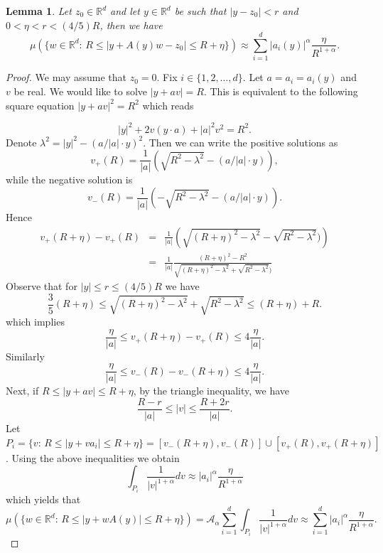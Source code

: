 \documentclass[a4paper,12pt,reqno]{amsart}
\newtheorem{lemma}[theorem]{Lemma}
\theoremstyle{definition}
\theoremstyle{remark}
\newcommand{\Aa}{\mathcal{A}_{\alpha}}
\newcommand{\R}{\mathds{R}}
\newcommand{\Rd}{\mathds{R}^d}
\begin{document}
\begin{lemma}\label{large} Let $z_0\in \Rd$ and let $y\in \Rd$ be such that $|y-z_0|< r$ and $0<\eta<r<(4/5)R$, then
we have $$\mu(\{w \in \R^d: \,  R\le|y + A(y) w- z_0|\le R+\eta\})\approx \sum_{i=1}^d|a_i(y)|^\alpha   \frac \eta{R^{1+\alpha}}.$$ 
\end{lemma}
\begin{proof} We may assume that $z_0=0$. Fix $i\in \{1,2,\dots,d\}$. Let  $ a= a_i= a_i(y)$ and $v$ be real.
We would like to solve $|y+av|=R$.  This is equivalent to the following square equation  $|y+av|^2=R^2$ which reads

$$|y|^2+2v(y\cdot a)+|a|^2v^2=R^2.$$
Denote $\lambda^2 = |y|^2- (a/|a|\cdot y)^2$.
Then we can write the positive solutions as  
\begin{equation}
\label{vplus}
v_{+}(R)=\frac1{|a|}\left( \sqrt {R^2-\lambda^2 }- (a/|a|\cdot y)\right),
\end{equation}
while the negative solution is
\begin{equation}
\label{vminus}
v_{-}(R)=\frac1{|a|}\left( -\sqrt {R^2-\lambda^2 }- (a/|a|\cdot y)\right).
\end{equation}
Hence
\begin{eqnarray*}v_{+}(R+\eta)-v_{+}(R)&=&\frac1{|a|}\left(\sqrt {(R+\eta)^2-\lambda^2 }- \sqrt {R^2-\lambda^2 })\right)\\
&=&\frac1{|a|}\frac {(R+\eta)^2-R^2}{\sqrt {(R+\eta)^2-\lambda^2 }+ \sqrt {R^2-\lambda^2 })}
\end{eqnarray*}
Observe that for $|y|\le r\le (4/5)R$ we have 
$$\frac35(R+\eta)\le \sqrt{(R+\eta)^2-\lambda^2 }+ \sqrt {R^2-\lambda^2 }\le (R+\eta)+R.$$
which implies 
$$\frac\eta {|a|}\le v_{+}(R+\eta)-v_{+}(R)\le 4\frac\eta {|a|}. $$ 
Similarly 
$$\frac\eta {|a|}\le v_{-}(R)-v_{-}(R+\eta)\le 4\frac\eta {|a|}. $$ 
Next, if 
$R\le |y+av|\le R+\eta$, by the triangle inequality, we have
$$\frac {R-r}{|a|} \le |v|\le \frac{R+ 2r}{|a|}.$$
Let $P_i= \{v: \, R\le  |y +va_i|\le R+\eta \}= [v_{-}(R+\eta), v_{-}(R)]\cup [v_{+}(R),v_{+}(R+\eta)]$. Using the above inequalities
we obtain
$$\int_{P_i}\frac1{|v|^{1+\alpha}}dv\approx |a_i|^\alpha \frac \eta{R^{1+\alpha}}$$
which yields that
$$\mu(\{w \in \R^d: \, R\le|y +wA(y)|\le R+\eta\})  = \Aa\sum_{i = 1}^d\int_{P_i}\frac1{|v|^{1+\alpha}}dv
\approx  \sum_{i=1}^d|a_i|^\alpha  \frac\eta{R^{1+\alpha}}.$$
\end{proof}
\end{document}
